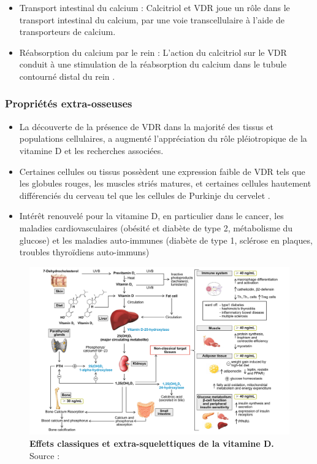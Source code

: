 \documentclass[
  letterpaper,
  DIV=11,
  numbers=noendperiod]{scrartcl}
\begin{document}
\begin{itemize}
\item
  Transport intestinal du calcium : Calcitriol et VDR joue un rôle dans
  le transport intestinal du calcium, par une voie transcellulaire à
  l'aide de transporteurs de calcium.
\item
  Réabsorption du calcium par le rein : L'action du calcitriol sur le
  VDR conduit à une stimulation de la réabsorption du calcium dans le
  tubule contourné distal du rein \autocite{Carmeliet.2015}.
\end{itemize}

\hypertarget{propriuxe9tuxe9s-extra-osseuses}{%
\subsubsection{Propriétés
extra-osseuses}\label{propriuxe9tuxe9s-extra-osseuses}}

\begin{itemize}
\item
  La découverte de la présence de VDR dans la majorité des tissus et
  populations cellulaires, a augmenté l'appréciation du rôle
  pléiotropique de la vitamine D \autocite{Rosen.2012} et les recherches
  associées.
\item
  Certaines cellules ou tissus possèdent une expression faible de VDR
  tels que les globules rouges, les muscles striés matures, et certaines
  cellules hautement différenciés du cerveau tel que les cellules de
  Purkinje du cervelet \autocite{Bouillon.2008}.
\item
  Intérêt renouvelé pour la vitamine D, en particulier dans le cancer,
  les maladies cardiovasculaires (obésité et diabète de type 2,
  métabolisme du glucose) et les maladies auto-immunes (diabète de type
  1, sclérose en plaques, troubles thyroïdiens auto-immuns)
  \autocite{Dankers.2017,Caprio.2017}
\end{itemize}

\begin{figure}

{\centering \includegraphics{figures/extra-skeletal-effect.png}

}

\caption{\label{fig-extra-skeletal}\textbf{Effets classiques et
extra-squelettiques de la vitamine D.} Source : \textcite{Caprio.2017}}

\end{figure}
\end{document}
